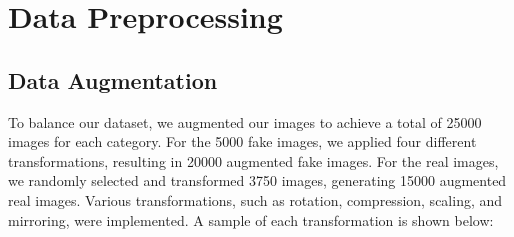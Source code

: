	\section{Data Preprocessing}
	\subsection{Data Augmentation}
		To balance our dataset, we augmented our images to achieve a total of 25000 images for each category. For the 5000 fake images, we applied four different transformations, resulting in 20000 augmented fake images. For the real images, we randomly selected and transformed 3750 images, generating 15000 augmented real images. Various transformations, such as rotation, compression, scaling, and mirroring, were implemented. A sample of each transformation is shown below:

